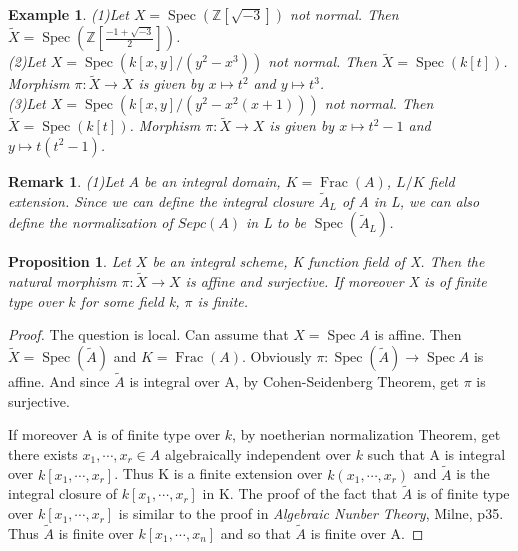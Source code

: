 \documentclass{ctexart}
\newtheorem{remark}{Remark}[section]
\newtheorem{proposition}{Proposition}[section]
\newtheorem{example}{Example}[section]
\newcommand{\spec}{\operatorname{Spec}}
\newcommand{\fraction}{\operatorname{Frac}}
\begin{document}
\begin{example}
    (1)Let $X = \spec(\mathbb{Z}[\sqrt{-3}])$ not normal.
    Then $\widetilde{X} = \spec(\mathbb{Z}[\frac{-1 + \sqrt{-3}}{2}])$. \\
    (2)Let $X = \spec(k[x, y]/(y^{2} - x^{3}))$ not normal.
    Then $\widetilde{X} = \spec(k[t])$.
    Morphism $\pi: \widetilde{X} \longrightarrow X$ is given by $x \longmapsto t^{2}$ and $y \longmapsto t^{3}$. \\
    (3)Let $X = \spec(k[x, y]/(y^{2} - x^{2}(x + 1)))$ not normal.
    Then $\widetilde{X} = \spec(k[t])$.
    Morphism $\pi: \widetilde{X} \longrightarrow X$ is given by $x \longmapsto t^{2} - 1$ and $y \longmapsto t(t^{2} - 1)$. 
\end{example}
\begin{remark}
    (1)Let $A$ be an integral domain, $K = \fraction(A)$, $L/K$ field extension.
    Since we can define the integral closure $\widetilde{A}_{L}$ of A in L, we can also define the normalization of $Sepc(A)$ in L to be $\spec(\widetilde{A}_{L})$.
\end{remark}
\begin{proposition}
    Let $X$ be an integral scheme, K function field of X.
    Then the natural morphism $\pi: \widetilde{X} \longrightarrow X$ is affine and surjective.
    If moreover X is of finite type over $k$ for some field k, $\pi$ is finite.
    \label{Proposition 5.2}
\end{proposition}
\begin{proof}
    The question is local.
    Can assume that $X = \spec A$ is affine.
    Then $\widetilde{X} = \spec(\widetilde{A})$ and $K = \fraction(A)$.
    Obviously $\pi: \spec(\widetilde{A}) \longrightarrow \spec A$ is affine.
    And since $\widetilde{A}$ is integral over A, by Cohen-Seidenberg Theorem, get $\pi$ is surjective.
    \par
    If moreover A is of finite type over $k$, by noetherian normalization Theorem, get there exists $x_{1}, \cdots, x_{r}\in A$ algebraically independent over $k$ such that A is integral over $k[x_{1}, \cdots, x_{r}]$.
    Thus K is a finite extension over $k(x_{1}, \cdots, x_{r})$ and $\widetilde{A}$ is the integral closure of $k[x_{1}, \cdots, x_{r}]$ in K.
    The proof of the fact that $\widetilde{A}$ is of finite type over $k[x_{1}, \cdots, x_{r}]$ is similar to the proof in \emph{Algebraic Nunber Theory}, Milne, p35.
    Thus $\widetilde{A}$ is finite over $k[x_{1}, \cdots, x_{n}]$ and so that $\widetilde{A}$ is finite over A.
\end{proof}
\end{document}
